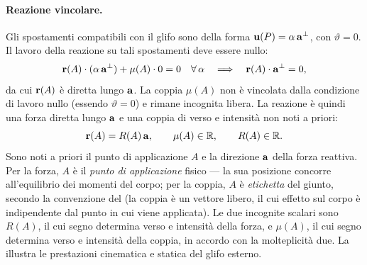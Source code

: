 




\paragraph{Reazione vincolare.}
Gli spostamenti compatibili con il glifo sono della forma
$\mathbf{u}(P) = \alpha\,\mathbf{a}^{\perp}$, con $\vartheta = 0$.
Il lavoro della reazione su tali spostamenti deve essere nullo:
\begin{equation}
	\mathbf{r}(A)\cdot(\alpha\,\mathbf{a}^{\perp}) + \mu(A) \cdot 0 = 0
	\quad \forall\,\alpha
	\quad\Longrightarrow\quad
	\mathbf{r}(A) \cdot \mathbf{a}^{\perp} = 0,
\end{equation}
da cui $\mathbf{r}(A)$ è diretta lungo $\mathbf{a}$. La coppia $\mu(A)$
non è vincolata dalla condizione di lavoro nullo (essendo
$\vartheta = 0$) e rimane incognita libera. La reazione è
quindi una forza diretta lungo $\mathbf{a}$ e una coppia di verso
e intensità non noti a priori:
\begin{equation}\label{eq:reazione_glifo}
	\mathbf{r}(A) = R(A)\,\mathbf{a},
	\qquad
	\mu(A) \in \mathbb{R},
	\qquad
	R(A) \in \mathbb{R}.
\end{equation}
Sono noti a priori il punto di applicazione $A$ e la direzione $\mathbf{a}$ della
forza reattiva. Per la forza, $A$ è il \emph{punto di
	applicazione} fisico — la sua posizione concorre
all'equilibrio dei momenti del corpo; per la coppia, $A$ è
\emph{etichetta} del giunto, secondo la convenzione del
 (la coppia è un vettore libero, il cui
effetto sul corpo è indipendente dal punto in cui viene
applicata). Le due incognite scalari sono $R(A)$, il cui
segno determina verso e intensità della forza, e $\mu(A)$,
il cui segno determina verso e intensità della coppia, in
accordo con la molteplicità due. La 
illustra le prestazioni cinematica e statica del glifo esterno.





